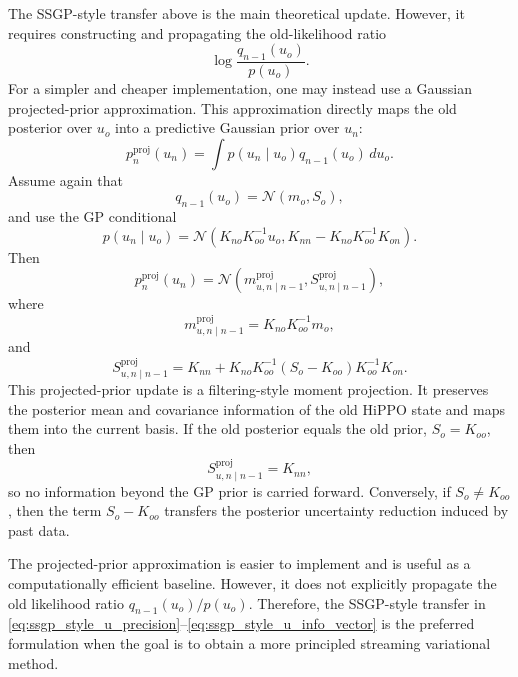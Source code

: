 \documentclass[12pt]{article}
\begin{document}
The SSGP-style transfer above is the main theoretical update. However, it requires
constructing and propagating the old-likelihood ratio
\begin{equation}
    \log
    \frac{q_{n-1}(u_o)}{p(u_o)}.
\end{equation}
For a simpler and cheaper implementation, one may instead use a Gaussian projected-prior
approximation. This approximation directly maps the old posterior over \(u_o\) into a
predictive Gaussian prior over \(u_n\):
\begin{equation}
    p_n^{\mathrm{proj}}(u_n)
    =
    \int
    p(u_n\mid u_o)
    q_{n-1}(u_o)
    \,du_o .
    \label{eq:posterior-to-prior-integral}
\end{equation}
Assume again that
\begin{equation}
    q_{n-1}(u_o)=\mathcal{N}(m_o,S_o),
\end{equation}
and use the GP conditional
\begin{equation}
    p(u_n\mid u_o)
    =
    \mathcal{N}
    \left(
        K_{no}K_{oo}^{-1}u_o,
        K_{nn}-K_{no}K_{oo}^{-1}K_{on}
    \right).
\end{equation}
Then
\begin{equation}
    p_n^{\mathrm{proj}}(u_n)
    =
    \mathcal{N}
    \left(
        m_{u,n\mid n-1}^{\mathrm{proj}},
        S_{u,n\mid n-1}^{\mathrm{proj}}
    \right),
\end{equation}
where
\begin{equation}
    m_{u,n\mid n-1}^{\mathrm{proj}}
    =
    K_{no}K_{oo}^{-1}m_o,
    \label{eq:transfer-mean}
\end{equation}
and
\begin{equation}
    S_{u,n\mid n-1}^{\mathrm{proj}}
    =
    K_{nn}
    +
    K_{no}K_{oo}^{-1}
    (S_o-K_{oo})
    K_{oo}^{-1}K_{on}.
    \label{eq:transfer-cov}
\end{equation}
This projected-prior update is a filtering-style moment projection. It preserves the
posterior mean and covariance information of the old HiPPO state and maps them into the
current basis. If the old posterior equals the old prior, \(S_o=K_{oo}\), then
\begin{equation}
    S_{u,n\mid n-1}^{\mathrm{proj}}=K_{nn},
\end{equation}
so no information beyond the GP prior is carried forward. Conversely, if \(S_o\neq K_{oo}\),
then the term \(S_o-K_{oo}\) transfers the posterior uncertainty reduction induced by
past data.

The projected-prior approximation is easier to implement and is useful as a computationally
efficient baseline. However, it does not explicitly propagate the old likelihood ratio
\(q_{n-1}(u_o)/p(u_o)\). Therefore, the SSGP-style transfer in
\eqref{eq:ssgp_style_u_precision}--\eqref{eq:ssgp_style_u_info_vector} is the preferred
formulation when the goal is to obtain a more principled streaming variational method.
\end{document}

